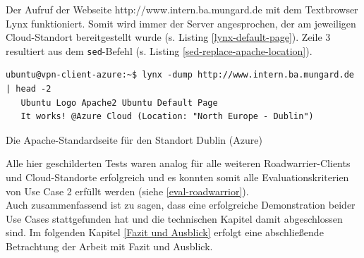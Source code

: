 Der Aufruf der Webseite \glqq http://www.intern.ba.mungard.de\grqq{} mit dem Textbrowser Lynx funktioniert. Somit wird immer der Server angesprochen, der am jeweiligen Cloud-Standort bereitgestellt wurde (s. Listing \ref{lynx-default-page}). Zeile 3 resultiert aus dem \texttt{sed}-Befehl (s. Listing \ref{sed-replace-apache-location}).
\begin{listing}[h]
\begin{verbatim}
ubuntu@vpn-client-azure:~$ lynx -dump http://www.intern.ba.mungard.de | head -2
   Ubuntu Logo Apache2 Ubuntu Default Page
   It works! @Azure Cloud (Location: "North Europe - Dublin")

\end{verbatim}
\caption{Die Apache-Standardseite für den Standort Dublin (Azure)}
\label{lynx-default-page}
\end{listing}\FloatBarrier
Alle hier geschilderten Tests waren analog für alle weiteren Roadwarrier-\gls{Client}s und Cloud-Standorte erfolgreich und es konnten somit alle Evaluationskriterien von Use Case 2 erfüllt werden (siehe \ref{eval-roadwarrior}).\\
Auch zusammenfassend ist zu sagen, dass eine erfolgreiche Demonstration beider Use Cases stattgefunden hat und die technischen Kapitel damit abgeschlossen sind. Im folgenden Kapitel \ref{Fazit und Ausblick} erfolgt eine abschließende Betrachtung der Arbeit mit Fazit und Ausblick.

